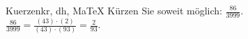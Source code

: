 \begin{MAufgabe}{Kuerzen}{kr, dh, MaTeX}
K\"urzen Sie soweit m\"oglich: $\frac{86}{3999}$.\\ 
\ifLsg\MLoesung
\quad $\frac{86}{3999}=\frac{(43)\cdot(2)}{(43)\cdot(93)}=\frac{2}{93}$.\else\relax\fi
 \end{MAufgabe}